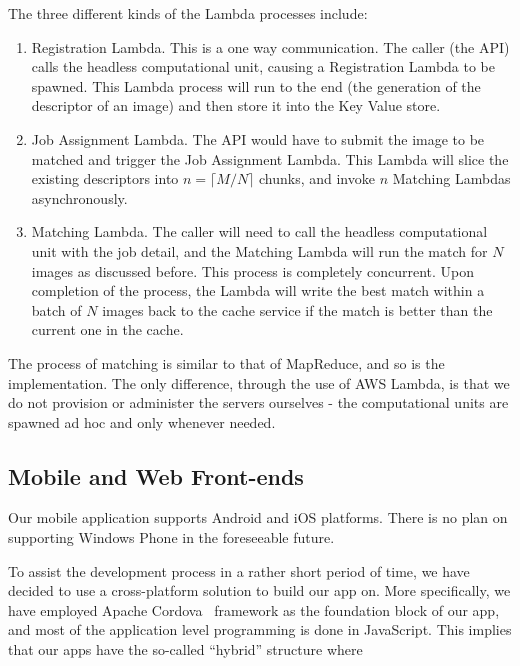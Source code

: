 The three different kinds of the Lambda processes include:

\begin{enumerate}
	\item Registration Lambda. This is a one way communication. The caller (the API) calls the headless computational unit, causing a Registration Lambda to be spawned. This Lambda process will run to the end (the generation of the descriptor of an image) and then store it into the Key Value store.
	\item Job Assignment Lambda. The API would have to submit the image to be matched and trigger the Job Assignment Lambda. This Lambda will slice the existing descriptors into $n=\lceil M / N \rceil$ chunks, and invoke $n$ Matching Lambdas asynchronously.
	\item Matching Lambda. The caller will need to call the headless computational unit with the job detail, and the Matching Lambda will run the match for $N$ images as discussed before. This process is completely concurrent. Upon completion of the process, the Lambda will write the best match within a batch of $N$ images back to the cache service if the match is better than the current one in the cache.
\end{enumerate}

The process of matching is similar to that of MapReduce, and so is the implementation. The only difference, through the use of AWS Lambda, is that we do not provision or administer the servers ourselves - the computational units are spawned ad hoc and only whenever needed.


\subsection{Mobile and Web Front-ends}
Our mobile application supports Android and iOS platforms. There is no plan on supporting Windows Phone in the foreseeable future.

To assist the development process in a rather short period of time, we have decided to use a cross-platform solution to build our app on. More specifically, we have employed Apache Cordova~\cite{cordova} framework as the foundation block of our app, and most of the application level programming is done in JavaScript. This implies that our apps have the so-called ``hybrid'' structure where

